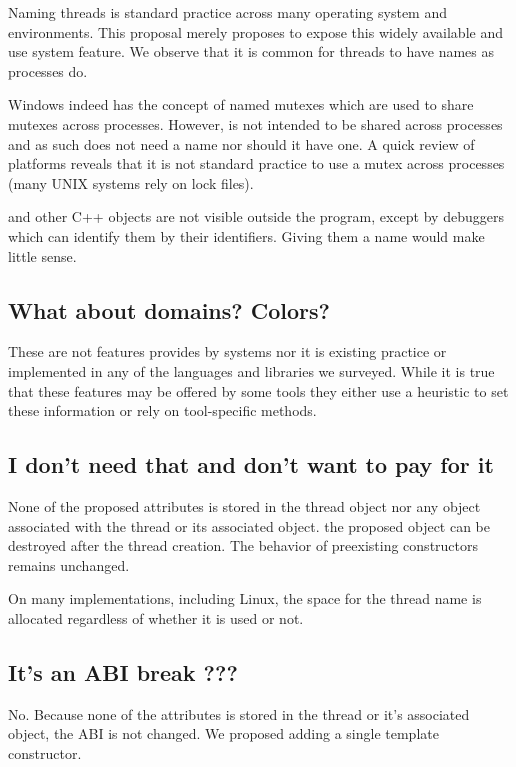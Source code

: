 \documentclass{wg21}
\begin{document}
Naming threads is standard practice across many operating system and environments.
This proposal merely proposes to expose this widely available and use system feature.
We observe that it is common for threads to have names as processes do.

Windows indeed has the concept of named mutexes which are used to share mutexes across processes.
However,  is not intended to be shared across processes and as such does not need
a name nor should it have one.
A quick review of platforms reveals that it is not standard practice to use a mutex across processes (many UNIX systems rely on lock files).

 and other C++ objects are not visible outside the program, except by debuggers which can identify them
by their identifiers. Giving them a name would make little sense.


\subsection{What about domains? Colors?}

These are not features provides by systems nor it is existing practice or implemented in any of the languages and libraries we surveyed.
While it is true that these features may be offered by some tools they either use a heuristic to set these information or rely on tool-specific methods. 

\subsection{I don't need that and don't want to pay for it}

None of the proposed attributes is stored in the thread object nor any object associated with the thread or its associated  object.
the proposed  object can be destroyed after the thread creation.
The behavior of preexisting constructors remains unchanged.

On many implementations, including Linux, the space for the thread name is allocated regardless of whether it is used or not.

\subsection{It's an ABI break ???}

No.
Because none of the attributes is stored in the thread or it's associated  object, the ABI is not changed.
We proposed adding a single template constructor.
\end{document}

